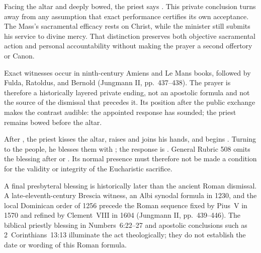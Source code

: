 
Facing the altar and deeply bowed, the priest says . This private conclusion turns away from any assumption that exact performance certifies its own acceptance. The Mass's sacramental efficacy rests on Christ, while the minister still submits his service to divine mercy. That distinction preserves both objective sacramental action and personal accountability without making the prayer a second offertory or Canon.

Exact  witnesses occur in ninth-century Amiens and Le Mans books, followed by Fulda, Ratoldus, and Bernold (Jungmann II, pp.~437--438). The prayer is therefore a historically layered private ending, not an apostolic formula and not the source of the dismissal that precedes it. Its position after the public exchange makes the contrast audible: the appointed response has sounded; the priest remains bowed before the altar.


After , the priest kisses the altar, raises and joins his hands, and begins . Turning to the people, he blesses them with ; the response is . General Rubric 508 omits the blessing after  or . Its normal presence must therefore not be made a condition for the validity or integrity of the Eucharistic sacrifice.

A final presbyteral blessing is historically later than the ancient Roman dismissal. A late-eleventh-century Brescia witness, an Albi synodal formula in 1230, and the local Dominican order of 1256 precede the Roman sequence fixed by Pius~V in 1570 and refined by Clement~VIII in 1604 (Jungmann II, pp.~439--446). The biblical priestly blessing in Numbers~6:22--27 and apostolic conclusions such as 2~Corinthians~13:13 illuminate the act theologically; they do not establish the date or wording of this Roman formula.

